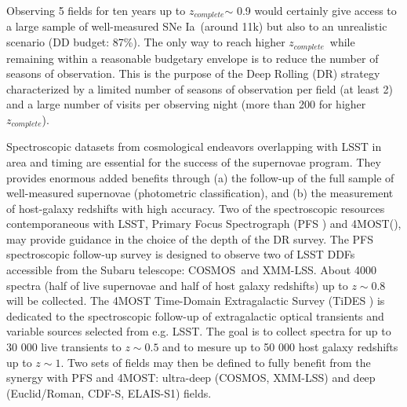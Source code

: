 \documentclass[skiphelvet,twocolumn]{lsstdescnote}
\newcommand{\cosmos}{{COSMOS}}
\newcommand{\elais}{{ELAIS-S1}}
\newcommand{\xmm}{{XMM-LSS}}
\newcommand{\cdfs}{{CDF-S}}
\newcommand{\adfs}{{Euclid/Roman}}
\newcommand{\sne}{{SNe Ia}}
\newcommand{\zcomp}{\mbox{$z_{complete}$}}
\begin{document}
Observing 5 fields for ten years up to \zcomp $\sim$ 0.9 would certainly give access to a large sample of well-measured \sne~(around 11k) but also to an unrealistic scenario (DD budget: 87\%). The only way to reach higher \zcomp~while remaining within a reasonable budgetary envelope is to reduce the number of seasons of observation. This is the purpose of the Deep Rolling (DR) strategy characterized by a limited number of seasons of observation per field (at least 2) and a large number of visits per observing night (more than 200 for higher \zcomp).
\par
Spectroscopic datasets from cosmological endeavors overlapping with LSST in area and timing are essential for the success of the supernovae program. They provides enormous added benefits through (a) the follow-up of the full sample of well-measured supernovae (photometric classification), and (b) the measurement of host-galaxy redshifts with high accuracy. Two of the spectroscopic resources contemporaneous with LSST, Primary Focus Spectrograph (PFS \cite{Tamura_2016}) and 4MOST(\cite{4MOST}), may provide guidance in the choice of the depth of the DR survey. The PFS spectroscopic follow-up survey is designed to observe two of LSST DDFs accessible from the Subaru telescope: \cosmos~and \xmm. About 4000 spectra (half of live supernovae and half of host galaxy redshifts) up to $z\sim0.8$ will be collected. The 4MOST Time-Domain Extragalactic Survey (TiDES \cite{TiDES}) is dedicated to the spectroscopic follow-up of extragalactic optical transients and variable sources selected from e.g. LSST. The goal is to collect spectra for up to 30 000 live transients to $z\sim0.5$ and to mesure up to 50 000 host galaxy redshifts up to $z\sim1$. Two sets of fields may then be defined to fully benefit from the synergy with PFS and 4MOST: ultra-deep (\cosmos, \xmm) and deep (\adfs, \cdfs, \elais) fields.
\end{document}

